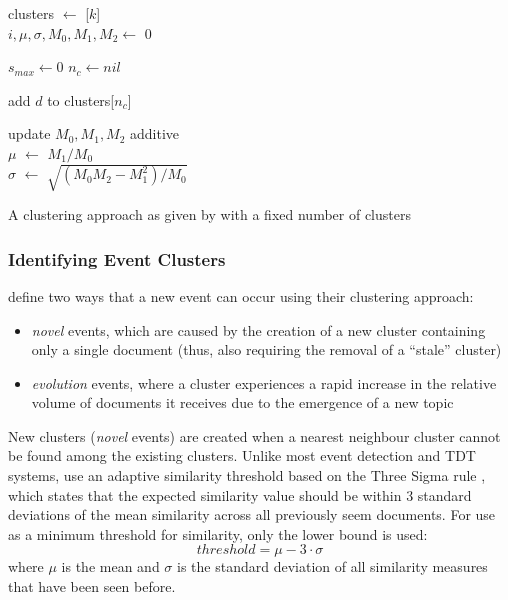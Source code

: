 \begin{algorithm}
	\DontPrintSemicolon
	clusters $\gets$ [$k$] \\
	$i, \mu, \sigma, M_0, M_1, M_2 \gets$ 0 \\

	 {
		$s_{max} \gets 0$ 
		$n_{c} \gets nil$ 

		 {
			add $d$ to clusters[$n_c$]
		}

	update $M_0, M_1, M_2$ additive \\
	$\mu$ $\gets$ $M_1/M_0$ \\
	$\sigma$ $\gets$ $\sqrt{(M_0M_2 - M_1^2) / M_0}$

	}
	\caption{A clustering approach as given by \cite{Aggarwal12} with a fixed number of clusters}
	\label{background:alg:sbs}
\end{algorithm}

\subsubsection{Identifying Event Clusters}
\cite{Aggarwal12} define two ways that a new event can occur using their clustering approach:
\begin{itemize}
	\item \emph{novel} events, which are caused by the creation of a new cluster containing only a single document (thus, also requiring the removal of a ``stale'' cluster)
	\item \emph{evolution} events, where a cluster experiences a rapid increase in the relative volume of documents it receives due to the emergence of a new topic
\end{itemize}

New clusters (\emph{novel} events) are created when a nearest neighbour cluster cannot be found among the existing clusters.
Unlike most event detection and TDT systems, \cite{Aggarwal12} use an adaptive similarity threshold based on the Three Sigma rule \citep{Pukelsheim94}, which states that the expected similarity value should be within 3 standard deviations of the mean similarity across all previously seem documents.
For use as a minimum threshold for similarity, only the lower bound is used:
\begin{equation}
	threshold = \mu - 3 \cdot \sigma
\end{equation}
where $\mu$ is the mean and $\sigma$ is the standard deviation of all similarity measures that have been seen before.

